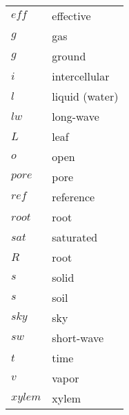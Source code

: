 \begin{longtable}{p{}p{}}
	${\mathit{eff}}$ 		& effective \\
	$g$ 					& gas \\
	$g$ 					& ground \\	
	$i$ 					& intercellular \\
	$l$ 					& liquid (water) \\
	$lw$ 					& long-wave \\	
	$L$ 					& leaf \\	
	$o$						& open \\
	$\mathit{pore}$			& pore \\
	$\mathit{ref}$ 			& reference \\
	$\mathit{root}$ 		& root \\
	$\mathit{sat}$ 			& saturated \\
	$R$ 					& root \\	
	$s$ 					& solid \\
	$s$ 					& soil \\	
	$sky$ 					& sky\\		
	$sw$ 					& short-wave \\	
	$t$ 					& time \\
	$v$ 					& vapor \\
	$xylem$ 				& xylem \\	
\end{longtable}
\vfill
\bigskip
%

